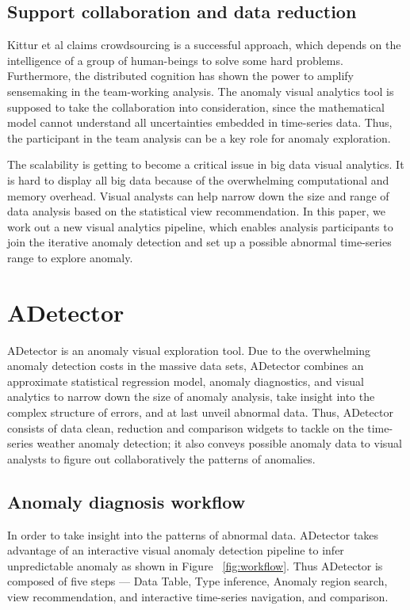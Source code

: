 \documentclass{vgtc}                          %
\begin{document}
\subsection{Support collaboration and data reduction}

Kittur et al\cite{kittur2008crowdsourcing} claims crowdsourcing is a successful approach, which depends on the intelligence of a group of human-beings to solve some hard problems. Furthermore, the distributed cognition\cite{liu2008distributed} has shown the power to amplify sensemaking in the team-working analysis. The anomaly visual analytics tool is supposed to take the collaboration into consideration, since the mathematical model cannot understand all uncertainties embedded in time-series data. Thus, the participant in the team analysis can be a key role for anomaly exploration.
	 
The scalability is getting to become a critical issue in big data visual analytics. It is hard to display all big data because of the overwhelming computational and memory overhead. Visual analysts can help narrow down the size and range of data analysis based on the statistical view recommendation. In this paper, we work out a new visual analytics pipeline, which enables analysis participants to join the iterative anomaly detection and set up a possible abnormal time-series range to explore anomaly.


\section{ADetector}

ADetector is an anomaly visual exploration tool. Due to the overwhelming anomaly detection costs in the massive data sets, ADetector combines an approximate statistical regression model, anomaly diagnostics, and visual analytics to narrow down the size of anomaly analysis, take insight into the complex structure of errors, and at last unveil abnormal data. Thus, ADetector consists of data clean, reduction and comparison widgets to tackle on the time-series weather anomaly detection; it also conveys possible anomaly data to visual analysts to figure out  collaboratively the patterns of anomalies.

\subsection{Anomaly diagnosis workflow}

In order to take insight into the patterns of abnormal data. ADetector takes advantage of an interactive visual anomaly detection pipeline to infer unpredictable anomaly as shown in Figure ~\ref{fig:workflow}. Thus ADetector is composed of five steps --- Data Table, Type inference, Anomaly region search, view recommendation, and interactive time-series navigation, and comparison.
\end{document}
